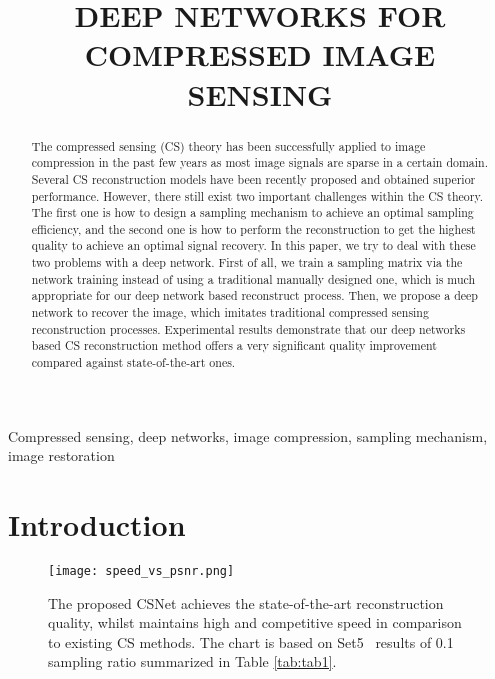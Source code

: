 \documentclass[5pt]{article}
\begin{document}
\sloppy

\def\x{{\mathbf x}}
\def\L{{\cal L}}


\title{DEEP NETWORKS FOR COMPRESSED IMAGE SENSING}
\address{Harbin Institute of Technology, NO. 92, Xidazhi Street, Harbin, Heilongjiang  150001}

\maketitle


\begin{abstract}
The compressed sensing (CS) theory has been successfully applied to image compression in the past few years as most image signals are sparse in a certain domain. Several CS reconstruction models have been recently proposed and obtained superior performance. However, there still exist two important challenges within the CS theory. The first one is how to design a sampling mechanism to achieve an optimal sampling efficiency, and the second one is how to perform the reconstruction to get the highest quality to achieve an optimal signal recovery. In this paper, we try to deal with these two problems with a deep network. First of all, we train a sampling matrix via the network training instead of using a traditional manually designed one, which is much appropriate for our deep network based reconstruct process. Then, we propose a deep network to recover the image, which imitates traditional compressed sensing reconstruction processes. Experimental results demonstrate that our deep networks based CS reconstruction method offers a very significant quality improvement compared against state-of-the-art ones.
\end{abstract}
\begin{keywords}
Compressed sensing, deep networks, image compression, sampling mechanism, image restoration
\end{keywords}
\section{Introduction}
\label{sec:intro}

\begin{figure}[t]
\centering
\texttt{[image: speed\_vs\_psnr.png]}
\vspace{-10pt}
\caption{\small {The proposed CSNet achieves the state-of-the-art reconstruction quality, whilst maintains high and competitive speed in comparison to existing CS methods. The chart is based on Set5~\cite{rf23} results of 0.1 sampling ratio summarized in Table \ref{tab:tab1}.}}
\vspace{-15pt}
\label{fig:fig1}
\end{figure}
\end{document}
